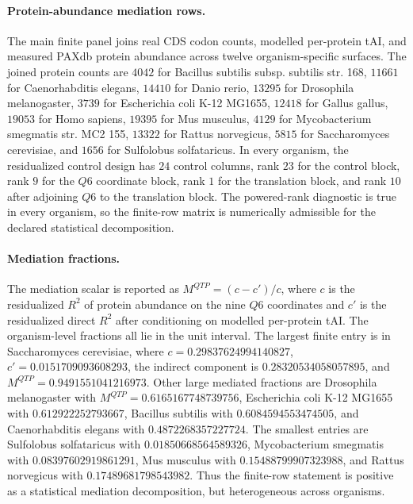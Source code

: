 \paragraph{Protein-abundance mediation rows.}
The main finite panel joins real CDS codon counts, modelled per-protein tAI, and measured PAXdb protein abundance across twelve organism-specific surfaces.  The joined protein counts are $4042$ for Bacillus subtilis subsp. subtilis str. 168, $11661$ for Caenorhabditis elegans, $14410$ for Danio rerio, $13295$ for Drosophila melanogaster, $3739$ for Escherichia coli K-12 MG1655, $12418$ for Gallus gallus, $19053$ for Homo sapiens, $19395$ for Mus musculus, $4129$ for Mycobacterium smegmatis str. MC2 155, $13322$ for Rattus norvegicus, $5815$ for Saccharomyces cerevisiae, and $1656$ for Sulfolobus solfataricus.  In every organism, the residualized control design has $24$ control columns, rank $23$ for the control block, rank $9$ for the $Q6$ coordinate block, rank $1$ for the translation block, and rank $10$ after adjoining $Q6$ to the translation block.  The powered-rank diagnostic is true in every organism, so the finite-row matrix is numerically admissible for the declared statistical decomposition.

\paragraph{Mediation fractions.}
The mediation scalar is reported as $M^{QTP}=(c-c')/c$, where $c$ is the residualized $R^2$ of protein abundance on the nine $Q6$ coordinates and $c'$ is the residualized direct $R^2$ after conditioning on modelled per-protein tAI.  The organism-level fractions all lie in the unit interval.  The largest finite entry is in Saccharomyces cerevisiae, where $c=0.29837624994140827$, $c'=0.0151709093608293$, the indirect component is $0.28320534058057895$, and $M^{QTP}=0.9491551041216973$.  Other large mediated fractions are Drosophila melanogaster with $M^{QTP}=0.6165167748739756$, Escherichia coli K-12 MG1655 with $0.612922252793667$, Bacillus subtilis with $0.6084594553474505$, and Caenorhabditis elegans with $0.4872268357227724$.  The smallest entries are Sulfolobus solfataricus with $0.01850668564589326$, Mycobacterium smegmatis with $0.08397602919861291$, Mus musculus with $0.15488799907323988$, and Rattus norvegicus with $0.17489681798543982$.  Thus the finite-row statement is positive as a statistical mediation decomposition, but heterogeneous across organisms.

